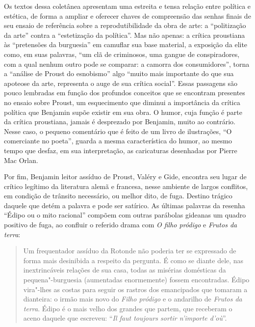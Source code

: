 Os textos dessa coletânea apresentam uma estreita e tensa relação entre
política e estética, de forma a ampliar e oferecer chaves de compreensão
das senhas finais de seu ensaio de referência sobre a reprodutibilidade
da obra de arte: a ``politização da arte'' contra a ``estetização da
política''. Mas não apenas: a crítica proustiana às ``pretensões da
burguesia'' em camuflar sua base material, a exposição da elite como, em
suas palavras, ``um clã de criminosos, uma gangue de conspiradores, com
a qual nenhum outro pode se comparar: a camorra dos consumidores'',
torna a ``análise de Proust do esnobismo'' algo ``muito mais importante
do que sua apoteose da arte, representa o auge de sua crítica social''.
Essas passagens são pouco lembradas em função dos profundos conceitos
que se encontram presentes no ensaio sobre Proust, um esquecimento que
diminui a importância da crítica política que Benjamin supõe existir em
sua obra. O humor, cuja função é parte da crítica proustiana, jamais é
desprezado por Benjamin, muito ao contrário. Nesse caso, o pequeno
comentário que é feito de um livro de ilustrações, ``O comerciante no
poeta'', guarda a mesma característica do humor, ao mesmo tempo que
desfaz, em sua interpretação, as caricaturas desenhadas por Pierre Mac
Orlan.

Por fim, Benjamin leitor assíduo de Proust, Valéry e Gide, encontra seu
lugar de crítico legítimo da literatura alemã e francesa, nesse ambiente
de largos conflitos, em condição de trânsito necessário, ou melhor dito,
de fuga. Destino trágico daquele que detém a palavra e pode ser
satírico. As últimas palavras da resenha ``Édipo ou o mito racional''
compõem com outras parábolas gideanas um quadro positivo de fuga, ao
confluir o referido drama com \emph{O filho pródigo} e \emph{Frutos da
terra}:

\begin{quote}
Um frequentador
assíduo da Rotonde não
poderia ter se expressado de forma mais desinibida a respeito da
pergunta. É como se diante dele, nas inextrincáveis relações de sua
casa, todas as misérias domésticas da pequena"-burguesia (aumentadas
enormemente) fossem encontradas. Édipo vira"-lhes as costas para seguir
os rastros dos emancipados que tomaram a dianteira: o irmão mais novo do
\emph{Filho pródigo} e o andarilho de \emph{Frutos da terra}. Édipo é o
mais velho dos grandes que partem, que receberam o aceno daquele que
escreveu: ``\emph{Il faut toujours sortir n'importe d'où}''.
\end{quote}

\asterisc

